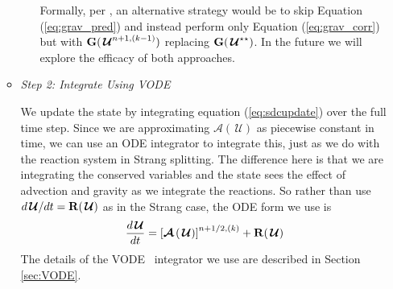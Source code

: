 \documentclass[linenumbers,trackchanges]{aastex631}
\newcommand{\omegadot}{\dot{\omega}}
\newcommand{\odt}[1]{{\frac{{d#1}}{dt}}}
\newcommand{\Uc}{{\,\bm{\mathcal{U}}}}
\newcommand{\Gb}{{\bf G}}
\newcommand{\Rb}{{\bf R}}
\newcommand{\Adv}[1]{{\left [\boldsymbol{\mathcal{A}} \left(#1\right)\right]}}
\newcommand{\MarginPar}[1]{\marginpar{\vskip-\baselineskip\raggedright\tiny\sffamily\hrule\smallskip{\color{red}#1}\par\smallskip\hrule}}
\begin{document}
\begin{itemize}
\begin{itemize}
\begin{itemize}
    Formally, per \cite{SDC-old}, an alternative strategy would be to skip Equation (\ref{eq:grav_pred}) and instead
    perform only Equation (\ref{eq:grav_corr}) but with $\Gb(\Uc^{n+1,(k-1)})$ replacing $\Gb(\Uc^{\star\star})$.
    In the future we will explore the efficacy of both approaches.

    \end{itemize}

  \item {\em Step 2: Integrate Using VODE}

    We update the state by integrating equation
    (\ref{eq:sdcupdate}) over the full time step.  Since we are approximating
    $\boldsymbol{\mathcal{A}}(\Uc)$ as piecewise constant in time, we can use an
    ODE integrator to integrate this, just as we do with the reaction
    system in Strang splitting.  The difference here is that we are
    integrating the conserved variables and the state sees the effect
    of advection and gravity as we integrate the reactions.  So rather than use
    $d\Uc/dt = \Rb(\Uc)$ as in the Strang case, the ODE form we use is
    \begin{equation}
      \odt{\Uc} = \Adv{\Uc}^{n+1/2,(k)} + \Rb(\Uc)
    \end{equation}
    The details of the VODE~\citep{vode} integrator we use are
    described in Section \ref{sec:VODE}.
    

\end{itemize}
\end{itemize}
\end{document}
